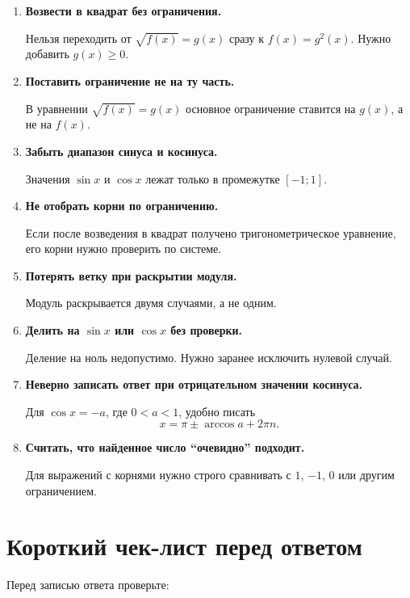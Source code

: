 \documentclass[a4paper,12pt]{article}
\begin{document}
\begin{enumerate}
  \item \textbf{Возвести в квадрат без ограничения.}

  Нельзя переходить от \(\sqrt{f(x)}=g(x)\) сразу к \(f(x)=g^2(x)\). Нужно добавить \(g(x)\ge0\).

  \item \textbf{Поставить ограничение не на ту часть.}

  В уравнении \(\sqrt{f(x)}=g(x)\) основное ограничение ставится на \(g(x)\), а не на \(f(x)\).

  \item \textbf{Забыть диапазон синуса и косинуса.}

  Значения \(\sin x\) и \(\cos x\) лежат только в промежутке \([-1;1]\).

  \item \textbf{Не отобрать корни по ограничению.}

  Если после возведения в квадрат получено тригонометрическое уравнение, его корни нужно проверить по системе.

  \item \textbf{Потерять ветку при раскрытии модуля.}

  Модуль раскрывается двумя случаями, а не одним.

  \item \textbf{Делить на \(\sin x\) или \(\cos x\) без проверки.}

  Деление на ноль недопустимо. Нужно заранее исключить нулевой случай.

  \item \textbf{Неверно записать ответ при отрицательном значении косинуса.}

  Для \(\cos x=-a\), где \(0<a<1\), удобно писать
  \[
  x=\pi\pm\arccos a+2\pi n.
  \]

  \item \textbf{Считать, что найденное число ``очевидно'' подходит.}

  Для выражений с корнями нужно строго сравнивать с \(1\), \(-1\), \(0\) или другим ограничением.
\end{enumerate}

\section{Короткий чек-лист перед ответом}

Перед записью ответа проверьте:
\end{document}
